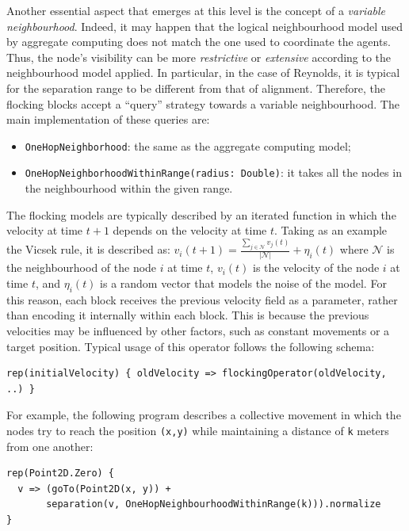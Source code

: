 Another essential aspect that emerges at this level is the concept of a \emph{variable neighbourhood}. 
%
Indeed, it may happen that the logical neighbourhood model used by aggregate computing 
 does not match the one used to coordinate the agents. 
 Thus, the node's visibility can be more \emph{restrictive} or \emph{extensive} 
 according to the neighbourhood model applied. 
%
In particular, in the case of Reynolds, 
 it is typical for the separation range to be different from that of alignment. 
% 
Therefore, the flocking blocks accept a ``query'' strategy towards a variable neighbourhood.
 The main implementation of these queries are:
\begin{itemize}
  \item \lstinline|OneHopNeighborhood|: the same as the aggregate computing model;
  \item \lstinline|OneHopNeighborhoodWithinRange(radius: Double)|: it takes all the nodes in the neighbourhood within the given range.
\end{itemize}

The flocking models are typically described 
 by an iterated function in which the velocity at time $t+1$ depends on the velocity at time $t$.
Taking as an example the Vicsek rule, it is described as:
$ v_i(t + 1) = \frac{\sum_{j \in \mathcal{N}}v_j(t) }{|\mathcal{N}|} + \eta_i(t)$
where $\mathcal{N}$ is the neighbourhood of the node $i$ at time $t$, 
 $v_i(t)$ is the velocity of the node $i$ at time $t$, 
 and $\eta_i(t)$ is a random vector that models the noise of the model.
%
For this reason, 
 each block receives the previous velocity field as a parameter, 
 rather than encoding it internally within each block. 
% 
This is because the previous velocities 
 may be influenced by other factors, 
 such as constant movements or a target position. 
%
Typical usage of this operator follows the following schema:
\begin{lstlisting}
rep(initialVelocity) { oldVelocity => flockingOperator(oldVelocity, ..) }  
\end{lstlisting}
For example, 
 the following program describes a collective movement 
 in which the nodes try to reach the position \texttt{(x,y)} while maintaining a distance of \texttt{k} meters from one another:
\begin{lstlisting}
rep(Point2D.Zero) {
  v => (goTo(Point2D(x, y)) + 
       separation(v, OneHopNeighbourhoodWithinRange(k))).normalize
}
\end{lstlisting}

